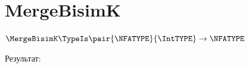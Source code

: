 \section{MergeBisimK}
\begin{frame}{$\MergeBisimK\TypeIs\pair{\NFATYPE}{\IntTYPE}\to\NFATYPE$}


	Результат:

\end{frame}